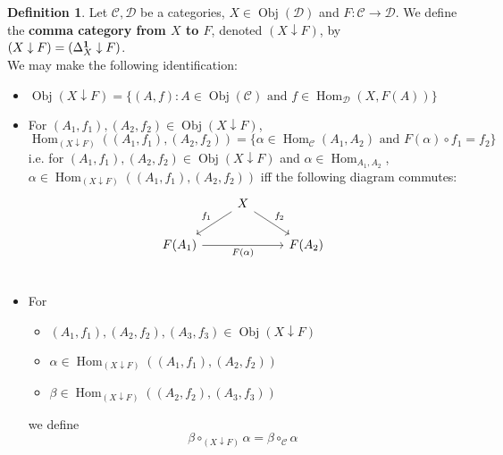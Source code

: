 \documentclass[12pt]{amsart}
\theoremstyle{definition}
\newtheorem{defn}[definition]{Definition}
\newcommand{\al}{\alpha}
\newcommand{\be}{\beta}
\newcommand{\Del}{\Delta}
\newcommand{\MC}{\mathcal{C}}
\newcommand{\MD}{\mathcal{D}}
\DeclareMathOperator{\Obj}{Obj}
\DeclareMathOperator{\Hom}{Hom}
\DeclareMathOperator*{\0}{\mbf{0}}
\DeclareMathOperator*{\1}{\mbf{1}}
\begin{document}
	\begin{defn}
		Let $\MC, \MD$ be a categories, $X \in \Obj(\MD)$ and $F: \MC \rightarrow \MD$. We define the \textbf{comma category from $X$ to $F$}, denoted $(X \downarrow F)$, by $(X \downarrow F) = (\Del^{\1}_X \downarrow F)$. \\
		We may make the following identification:
		\begin{itemize}
			\item $\Obj(X \downarrow F) = \{(A, f): A \in \Obj(\MC) \text{ and } f \in \Hom_{\MD}(X, F(A))\}$ 
			\item For $(A_1, f_1), (A_2, f_2) \in \Obj(X \downarrow F)$, 
			$$\Hom_{(X \downarrow F)}((A_1, f_1), (A_2, f_2)) = \{\al \in \Hom_{\MC}(A_1, A_2) \text{ and } F(\al) \circ f_1 = f_2\}$$
			i.e. for $(A_1, f_1), (A_2, f_2) \in \Obj(X \downarrow F)$ and $\al \in \Hom_{A_1, A_2}$, $\al \in \Hom_{(X \downarrow F)}((A_1, f_1), (A_2, f_2))$ iff the following diagram commutes:
			\[ 
			\begin{tikzcd}
				&  X \arrow[dl, "f_1"']  \arrow[dr, "f_2"] & \\
				F(A_1)  \arrow[rr, "F(\al)"'] &&  F(A_2) \\ 
			\end{tikzcd}
			\]
			\item For 
			\begin{itemize}
				\item $(A_1, f_1), (A_2, f_2), (A_3, f_3) \in \Obj(X \downarrow F)$
				\item $\al \in \Hom_{(X \downarrow F)}((A_1, f_1), (A_2, f_2))$
				\item $\be \in \Hom_{(X \downarrow F)}((A_2, f_2), (A_3, f_3))$
			\end{itemize}
			we define 
			$$\be \circ_{(X \downarrow F)} \al = \be \circ_{\MC} \al $$
		\end{itemize}
	\end{defn}
\end{document}
